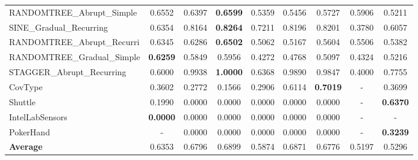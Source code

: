 \begin{table}[htbp]
\begin{tabular}{lcccccccc}
RANDOMTREE_Abrupt_Simple & 0.6552 & 0.6397 & \textbf{0.6599} & 0.5359 & 0.5456 & 0.5727 & 0.5906 & 0.5211 \\
SINE_Gradual_Recurring & 0.6354 & 0.8164 & \textbf{0.8264} & 0.7211 & 0.8196 & 0.8201 & 0.3780 & 0.6057 \\
RANDOMTREE_Abrupt_Recurri & 0.6345 & 0.6286 & \textbf{0.6502} & 0.5062 & 0.5167 & 0.5604 & 0.5506 & 0.5382 \\
RANDOMTREE_Gradual_Simple & \textbf{0.6259} & 0.5849 & 0.5956 & 0.4272 & 0.4768 & 0.5097 & 0.4324 & 0.5216 \\
STAGGER_Abrupt_Recurring & 0.6000 & 0.9938 & \textbf{1.0000} & 0.6368 & 0.9890 & 0.9847 & 0.4000 & 0.7755 \\
CovType & 0.3602 & 0.2772 & 0.1566 & 0.2906 & 0.6114 & \textbf{0.7019} & - & 0.3699 \\
Shuttle & 0.1990 & 0.0000 & 0.0000 & 0.0000 & 0.0000 & 0.0000 & - & \textbf{0.6370} \\
IntelLabSensors & \textbf{0.0000} & 0.0000 & 0.0000 & 0.0000 & 0.0000 & 0.0000 & - & - \\
PokerHand & - & 0.0000 & 0.0000 & 0.0000 & 0.0000 & 0.0000 & - & \textbf{0.3239} \\
\midrule
\textbf{Average} & 0.6353 & 0.6796 & 0.6899 & 0.5874 & 0.6871 & 0.6776 & 0.5197 & 0.5296 \\
\bottomrule
\end{tabular}
\end{table}